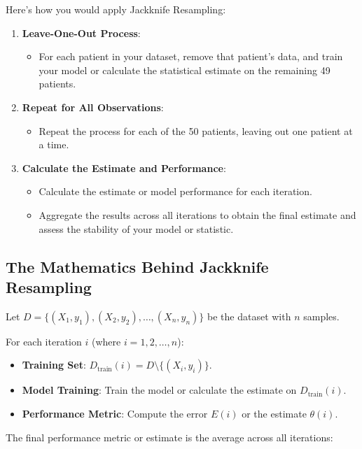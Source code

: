 \documentclass[10pt]{article}
\begin{document}
Here’s how you would apply Jackknife Resampling:

\begin{enumerate}
    \item \textbf{Leave-One-Out Process}:
    \begin{itemize}
        \item For each patient in your dataset, remove that patient’s data, and train your model or calculate the statistical estimate on the remaining 49 patients.
    \end{itemize}
    \item \textbf{Repeat for All Observations}:
    \begin{itemize}
        \item Repeat the process for each of the 50 patients, leaving out one patient at a time.
    \end{itemize}
    \item \textbf{Calculate the Estimate and Performance}:
    \begin{itemize}
        \item Calculate the estimate or model performance for each iteration.
        \item Aggregate the results across all iterations to obtain the final estimate and assess the stability of your model or statistic.
    \end{itemize}
\end{enumerate}

\subsection{The Mathematics Behind Jackknife Resampling}
Let \(D = \{(X_1, y_1), (X_2, y_2), \dots, (X_n, y_n)\}\) be the dataset with \(n\) samples.

For each iteration \(i\) (where \(i=1,2,\dots,n\)):

\begin{itemize}
    \item \textbf{Training Set}: \(D_{\text{train}}(i) = D \setminus \{(X_i, y_i)\}\).
    \item \textbf{Model Training}: Train the model or calculate the estimate on \(D_{\text{train}}(i)\).
    \item \textbf{Performance Metric}: Compute the error \(E(i)\) or the estimate \(\theta(i)\).
\end{itemize}

The final performance metric or estimate is the average across all iterations:
\end{document}
